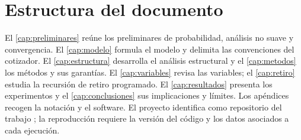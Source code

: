 \section{Estructura del documento}

El \cref{cap:preliminares} reúne los preliminares de probabilidad, análisis no
suave y convergencia. El \cref{cap:modelo} formula el modelo y delimita las
convenciones del cotizador. El \cref{cap:estructura} desarrolla el análisis
estructural y el \cref{cap:metodos} los métodos y sus garantías. El
\cref{cap:variables} revisa las variables; el \cref{cap:retiro} estudia la
recursión de retiro programado. El \cref{cap:resultados} presenta los experimentos
y el \cref{cap:conclusiones} sus implicaciones y límites. Los apéndices recogen la
notación y el software. El proyecto identifica como repositorio del trabajo
\repositorio; la reproducción requiere la versión del código y los datos
asociados a cada ejecución.
